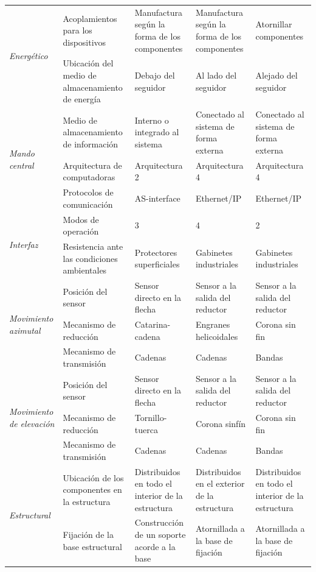 \begin{longtable}{@{}|p{2cm}|p{2.5cm}|p{2.5cm}|p{2.5cm}|p{2.5cm}|}
	\multirow{2}{2cm}{\textit{Energético}} & Acoplamientos para los dispositivos & Manufactura según la forma de los componentes & Manufactura según la forma de los componentes & Atornillar componentes \\ 
	\cline{2-5} & Ubicación del medio de almacenamiento de energía & Debajo del seguidor & Al lado del seguidor & Alejado del seguidor \\ 
	\hline \hline
	\multirow{3}{2cm}{\textit{Mando central}} & Medio de almacenamiento de información & Interno o integrado al sistema & Conectado al sistema de forma externa & Conectado al sistema de forma externa \\ 
	\cline{2-5} & Arquitectura de computadoras & Arquitectura 2 & Arquitectura 4 & Arquitectura 4 \\ 
	\cline{2-5} & Protocolos de comunicación & AS-interface & Ethernet/IP & Ethernet/IP \\ 
	\hline \hline
	\multirow{2}{2cm}{\textit{Interfaz}} & Modos de operación & 3 & 4 & 2 \\ 
	\cline{2-5} & Resistencia ante las condiciones ambientales & Protectores superficiales & Gabinetes industriales & Gabinetes industriales \\ 
	\hline \hline
	\multirow{3}{2cm}{\textit{Movimiento azimutal}} & Posición del sensor & Sensor directo en la flecha & Sensor a la salida del reductor & Sensor a la salida del reductor \\ 
	\cline{2-5} & Mecanismo de reducción & Catarina-cadena & Engranes helicoidales & Corona sin fin \\ 
	\cline{2-5} & Mecanismo de transmisión & Cadenas & Cadenas & Bandas \\ 
	\hline \hline
	\multirow{3}{2cm}{\textit{Movimiento de elevación}} & Posición del sensor & Sensor directo en la flecha & Sensor a la salida del reductor & Sensor a la salida del reductor \\ 
	\cline{2-5} & Mecanismo de reducción & Tornillo-tuerca & Corona sinfín & Corona sin fin \\ 
	\cline{2-5} & Mecanismo de transmisión & Cadenas & Cadenas & Bandas \\ 
	\hline \hline
	\multirow{5}{2cm}{\textit{Estructural}} & Ubicación de los componentes en la estructura & Distribuidos en todo el interior de la estructura & Distribuidos en el exterior de la estructura & Distribuidos en todo el interior de la estructura \\ 
	\cline{2-5} & Fijación de la base estructural & Construcción de un soporte acorde a la base & Atornillada a la base de fijación & Atornillada a la base de fijación \\ 

\end{longtable}
